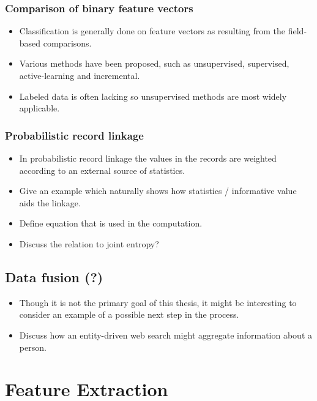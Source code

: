 \documentclass[paper=a4, fontsize=11pt]{scrartcl}
\begin{document}
\subsubsection{Comparison of binary feature vectors}
\begin{itemize}
    \item Classification is generally done on feature vectors as resulting from the field-based comparisons.
    \item Various methods have been proposed, such as unsupervised, supervised, active-learning and incremental.
    \item Labeled data is often lacking so unsupervised methods are most widely applicable.
\end{itemize}

\subsubsection{Probabilistic record linkage}
\begin{itemize}
    \item In probabilistic record linkage the values in the records are weighted according to an external source of statistics.
    \item Give an example which naturally shows how statistics / informative value aids the linkage.
    \item Define equation that is used in the computation.
    \item Discuss the relation to joint entropy?
\end{itemize}

\subsection{Data fusion (?)}
\begin{itemize}
    \item Though it is not the primary goal of this thesis, it might be interesting to consider an example of a possible next step in the process.
    \item Discuss how an entity-driven web search might aggregate information about a person.
\end{itemize}




\section{Feature Extraction}
\end{document}
